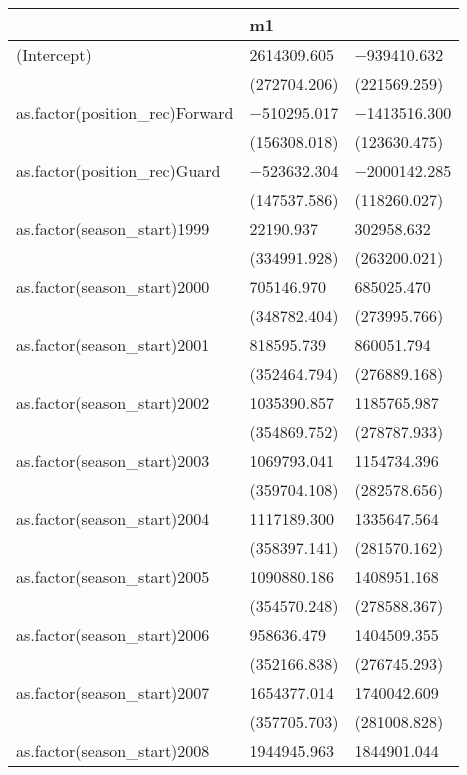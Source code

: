 \documentclass[
]{book}
\begin{document}
\begin{table}
\centering
\begin{tabular}[t]{lll}
\toprule
  & m1 &   \\
\midrule
(Intercept) & \num{2614309.605} & \num{-939410.632}\\
 & (\num{272704.206}) & (\num{221569.259})\\
as.factor(position\_rec)Forward & \num{-510295.017} & \num{-1413516.300}\\
 & (\num{156308.018}) & (\num{123630.475})\\
as.factor(position\_rec)Guard & \num{-523632.304} & \num{-2000142.285}\\
 & (\num{147537.586}) & (\num{118260.027})\\
as.factor(season\_start)1999 & \num{22190.937} & \num{302958.632}\\
 & (\num{334991.928}) & (\num{263200.021})\\
as.factor(season\_start)2000 & \num{705146.970} & \num{685025.470}\\
 & (\num{348782.404}) & (\num{273995.766})\\
as.factor(season\_start)2001 & \num{818595.739} & \num{860051.794}\\
 & (\num{352464.794}) & (\num{276889.168})\\
as.factor(season\_start)2002 & \num{1035390.857} & \num{1185765.987}\\
 & (\num{354869.752}) & (\num{278787.933})\\
as.factor(season\_start)2003 & \num{1069793.041} & \num{1154734.396}\\
 & (\num{359704.108}) & (\num{282578.656})\\
as.factor(season\_start)2004 & \num{1117189.300} & \num{1335647.564}\\
 & (\num{358397.141}) & (\num{281570.162})\\
as.factor(season\_start)2005 & \num{1090880.186} & \num{1408951.168}\\
 & (\num{354570.248}) & (\num{278588.367})\\
as.factor(season\_start)2006 & \num{958636.479} & \num{1404509.355}\\
 & (\num{352166.838}) & (\num{276745.293})\\
as.factor(season\_start)2007 & \num{1654377.014} & \num{1740042.609}\\
 & (\num{357705.703}) & (\num{281008.828})\\
as.factor(season\_start)2008 & \num{1944945.963} & \num{1844901.044}\\

\end{tabular}
\end{table}
\end{document}

